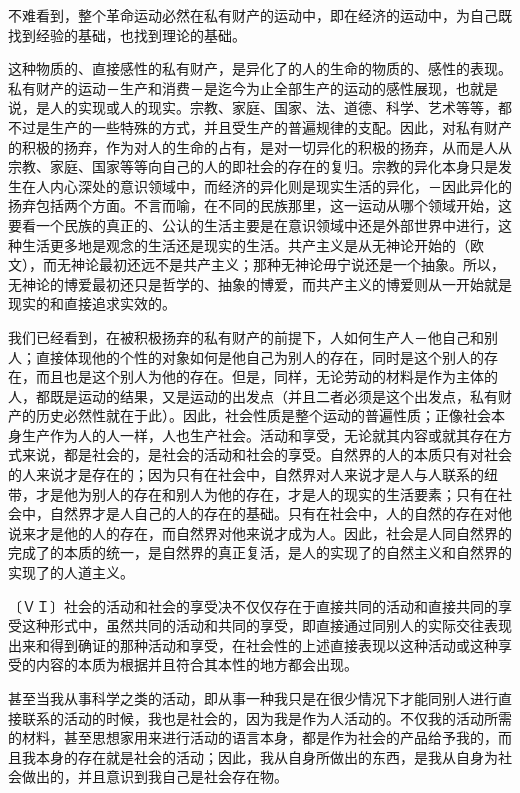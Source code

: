 \documentclass[a4paper,twoside,12pt]{ctexart}
\begin{document}
不难看到，整个革命运动必然在私有财产的运动中，即在经济的运动中，为自己既找到经验的基础，也找到理论的基础。

这种物质的、直接感性的私有财产，是异化了的人的生命的物质的、感性的表现。私有财产的运动－生产和消费－是迄今为止全部生产的运动的感性展现，也就是说，是人的实现或人的现实。宗教、家庭、国家、法、道德、科学、艺术等等，都不过是生产的一些特殊的方式，并且受生产的普遍规律的支配。因此，对私有财产的积极的扬弃，作为对人的生命的占有，是对一切异化的积极的扬弃，从而是人从宗教、家庭、国家等等向自己的人的即社会的存在的复归。宗教的异化本身只是发生在人内心深处的意识领域中，而经济的异化则是现实生活的异化，－因此异化的扬弃包括两个方面。不言而喻，在不同的民族那里，这一运动从哪个领域开始，这要看一个民族的真正的、公认的生活主要是在意识领域中还是外部世界中进行，这种生活更多地是观念的生活还是现实的生活。共产主义是从无神论开始的（欧文），而无神论最初还远不是共产主义；那种无神论毋宁说还是一个抽象。所以，无神论的博爱最初还只是哲学的、抽象的博爱，而共产主义的博爱则从一开始就是现实的和直接追求实效的。

我们已经看到，在被积极扬弃的私有财产的前提下，人如何生产人－他自己和别人；直接体现他的个性的对象如何是他自己为别人的存在，同时是这个别人的存在，而且也是这个别人为他的存在。但是，同样，无论劳动的材料是作为主体的人，都既是运动的结果，又是运动的出发点（并且二者必须是这个出发点，私有财产的历史必然性就在于此）。因此，社会性质是整个运动的普遍性质；正像社会本身生产作为人的人一样，人也生产社会。活动和享受，无论就其内容或就其存在方式来说，都是社会的，是社会的活动和社会的享受。自然界的人的本质只有对社会的人来说才是存在的；因为只有在社会中，自然界对人来说才是人与人联系的纽带，才是他为别人的存在和别人为他的存在，才是人的现实的生活要素；只有在社会中，自然界才是人自己的人的存在的基础。只有在社会中，人的自然的存在对他说来才是他的人的存在，而自然界对他来说才成为人。因此，社会是人同自然界的完成了的本质的统一，是自然界的真正复活，是人的实现了的自然主义和自然界的实现了的人道主义。

〔ＶＩ〕社会的活动和社会的享受决不仅仅存在于直接共同的活动和直接共同的享受这种形式中，虽然共同的活动和共同的享受，即直接通过同别人的实际交往表现出来和得到确证的那种活动和享受，在社会性的上述直接表现以这种活动或这种享受的内容的本质为根据并且符合其本性的地方都会出现。

甚至当我从事科学之类的活动，即从事一种我只是在很少情况下才能同别人进行直接联系的活动的时候，我也是社会的，因为我是作为人活动的。不仅我的活动所需的材料，甚至思想家用来进行活动的语言本身，都是作为社会的产品给予我的，而且我本身的存在就是社会的活动；因此，我从自身所做出的东西，是我从自身为社会做出的，并且意识到我自己是社会存在物。
\end{document}
